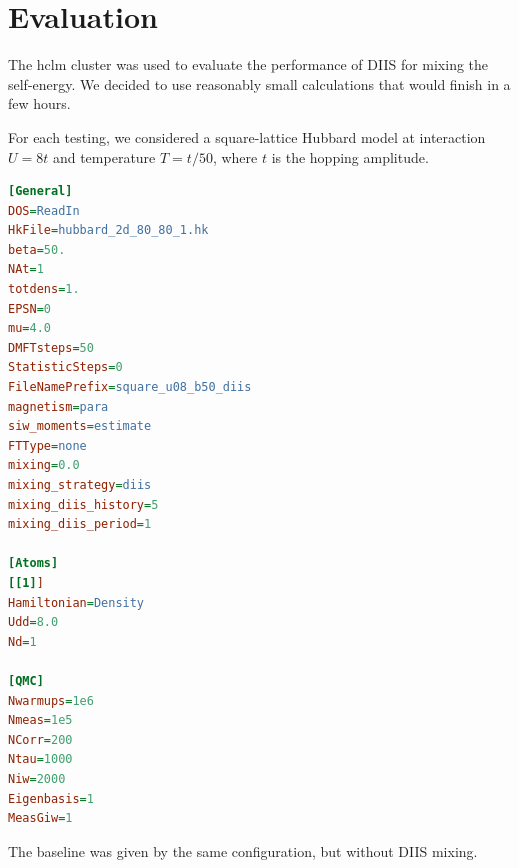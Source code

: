 \chapter{Evaluation}
\label{ch:evaluation}
The hclm cluster was used to evaluate the performance of DIIS for mixing the self-energy. We decided to use reasonably small calculations that would finish in a few hours.

For each testing, we considered a square-lattice Hubbard model at interaction $U=8t$ and temperature $T=t/50$, where $t$ is the hopping amplitude.


\begin{lstlisting}[label=lst:w2dyn_config, language=ini, caption=The w2dynmaics configuration for this case]
[General]
DOS=ReadIn
HkFile=hubbard_2d_80_80_1.hk
beta=50.
NAt=1
totdens=1.
EPSN=0
mu=4.0
DMFTsteps=50
StatisticSteps=0
FileNamePrefix=square_u08_b50_diis
magnetism=para
siw_moments=estimate
FTType=none
mixing=0.0
mixing_strategy=diis
mixing_diis_history=5
mixing_diis_period=1

[Atoms]
[[1]]
Hamiltonian=Density
Udd=8.0
Nd=1

[QMC]
Nwarmups=1e6
Nmeas=1e5
NCorr=200
Ntau=1000
Niw=2000
Eigenbasis=1 
MeasGiw=1
\end{lstlisting}

The baseline was given by the same configuration, but without DIIS mixing.

